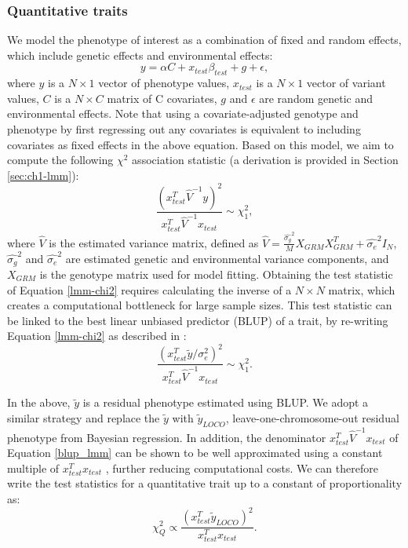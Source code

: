 \subsubsection{Quantitative traits} 
%
We model the phenotype of interest as a combination of fixed and random effects, which include genetic effects and environmental effects:
\begin{equation}
    y = \alpha C + x_{test}\beta_{test} + g + \epsilon, \label{eq:lin_lmm}
\end{equation}
where $y$ is a $N \times 1$ vector of phenotype values, $x_{test}$ is a $N \times 1$ vector of variant values, $C$ is a $N \times C$ matrix of C covariates, $g$ and $\epsilon$ are random genetic and environmental effects.
%
Note that using a covariate-adjusted genotype and phenotype by first regressing out any covariates is equivalent to including covariates as fixed effects in the above equation.
%
Based on this model, we aim to compute the following $\chi^2$ association statistic (a derivation is provided in Section \ref{sec:ch1-lmm}): 
\begin{equation}
   \frac{(x_{test}^T \hat{V}^{-1} y)^2}{x_{test}^T \hat{V}^{-1} x_{test}} \sim \chi^2_1, \label{lmm-chi2}
\end{equation}
where $\hat{V}$ is the estimated variance matrix, defined as $\hat{V} = \frac{\hat{\sigma_g}^2}{M} X_{GRM}X_{GRM}^T + \hat{\sigma_e}^2 I_N$, $\hat{\sigma_g}^2$ and $\hat{\sigma_e}^2$ are estimated genetic and environmental variance components, and $X_{GRM}$ is the genotype matrix used for model fitting.
%
Obtaining the test statistic of Equation \ref{lmm-chi2} requires calculating the inverse of a $N \times N$ matrix, which creates a computational bottleneck for large sample sizes.
%
This test statistic can be linked to the best linear unbiased predictor (BLUP) of a trait, by re-writing Equation \ref{lmm-chi2} as described in \cite{loh2015efficient}:
\begin{equation}
    \frac{(x_{test}^T \tilde{y}/\sigma_e^2)^2}{x_{test}^T \hat{V}^{-1} x_{test}} \sim \chi^2_1.
    \label{blup_lmm}
\end{equation}

%
In the above, $\tilde{y}$ is a residual phenotype estimated using BLUP.
%
We adopt a similar strategy and replace the $\tilde{y}$ with $\tilde{y}_{LOCO}$, leave-one-chromosome-out residual phenotype from Bayesian regression.
%
In addition, the denominator $x_{test}^T \hat{V}^{-1} x_{test}$ of Equation \ref{blup_lmm} can be shown to be well approximated using a constant multiple of $x_{test}^T x_{test}$ \cite{svishcheva2012rapid}, further reducing computational costs.
%
We can therefore write the test statistics for a quantitative trait up to a constant of proportionality as:
\begin{equation}
    \chi^2_{Q} \propto \frac{(x_{test}^T \tilde{y}_{LOCO})^2}{x_{test}^T x_{test}}.
    \label{chisq_test_2}
\end{equation}

